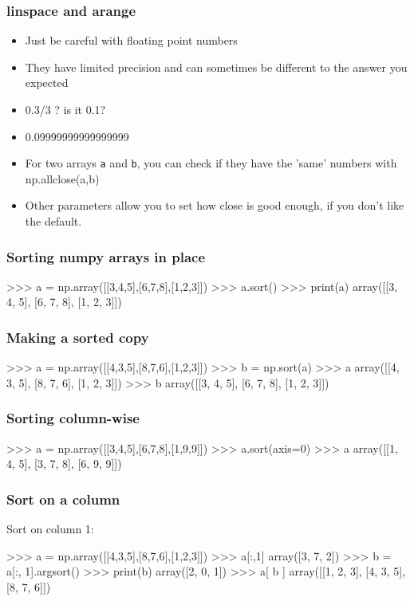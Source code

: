 \documentclass{beamer}
\begin{document}
\begin{frame}[fragile]
\frametitle{linspace and arange}
\begin{itemize}
\item Just be careful with floating point numbers
\item They have limited precision and can sometimes be different to
  the answer you expected
\item 0.3/3 ? is it 0.1?
\item 0.09999999999999999
\item For two arrays \texttt{a} and \texttt{b}, you can check if they have the 'same'
  numbers with np.allclose(a,b)
\item Other parameters allow you to set how close is good enough, if
  you don't like the default.
\end{itemize}
\end{frame}


\begin{frame}[fragile]
\frametitle{Sorting numpy arrays in place}
\begin{code}
>>> a = np.array([[3,4,5],[6,7,8],[1,2,3]])
>>> a.sort()
>>> print(a)
array([[3, 4, 5],
       [6, 7, 8],
       [1, 2, 3]])
\end{code}
\end{frame}

\begin{frame}[fragile]
\frametitle{Making a sorted copy}
\begin{code}
>>> a = np.array([[4,3,5],[8,7,6],[1,2,3]])
>>> b = np.sort(a)
>>> a
array([[4, 3, 5],
       [8, 7, 6],
       [1, 2, 3]])
>>> b
array([[3, 4, 5],
       [6, 7, 8],
       [1, 2, 3]])
\end{code}
\end{frame}

\begin{frame}[fragile]
\frametitle{{Sorting column-wise}}
\begin{code}
>>> a = np.array([[3,4,5],[6,7,8],[1,9,9]])
>>> a.sort(axis=0)
>>> a
array([[1, 4, 5],
       [3, 7, 8],
       [6, 9, 9]])
\end{code}
\end{frame}

\begin{frame}[fragile]
\frametitle{{Sort on a column}}
Sort on column 1:
\begin{code}
>>> a = np.array([[4,3,5],[8,7,6],[1,2,3]])
>>> a[:,1]
array([3, 7, 2])
>>> b = a[:, 1].argsort()
>>> print(b)
array([2, 0, 1])
>>> a[ b ]
array([[1, 2, 3],
       [4, 3, 5],
       [8, 7, 6]])
\end{code}
\end{frame}
\end{document}
